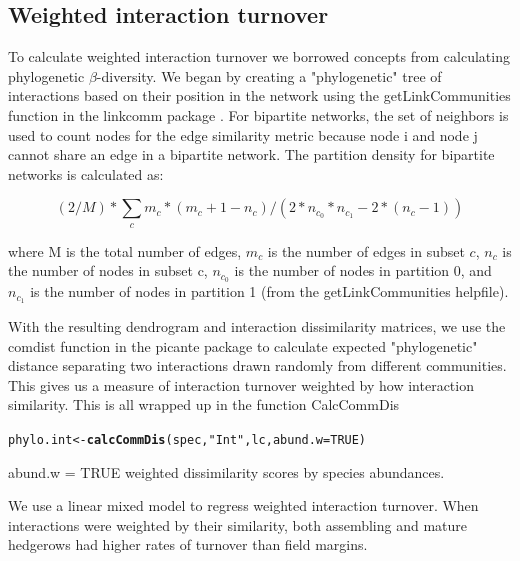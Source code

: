 \documentclass{article}\usepackage[]{graphicx}\usepackage[]{color}
\makeatletter
\newcommand{\hlnum}[1]{\textcolor[rgb]{0.686,0.059,0.569}{#1}}%
\newcommand{\hlstr}[1]{\textcolor[rgb]{0.192,0.494,0.8}{#1}}%
\newcommand{\hlstd}[1]{\textcolor[rgb]{0.345,0.345,0.345}{#1}}%
\newcommand{\hlkwb}[1]{\textcolor[rgb]{0.69,0.353,0.396}{#1}}%
\newcommand{\hlkwc}[1]{\textcolor[rgb]{0.333,0.667,0.333}{#1}}%
\newcommand{\hlkwd}[1]{\textcolor[rgb]{0.737,0.353,0.396}{\textbf{#1}}}%
\newenvironment{kframe}{%
 \def\at@end@of@kframe{}%
 \ifinner\ifhmode%
  \def\at@end@of@kframe{\end{minipage}}%
  \begin{minipage}{\columnwidth}%
 \fi\fi%
 \def\FrameCommand##1{\hskip\@totalleftmargin \hskip-\fboxsep
 \colorbox{shadecolor}{##1}\hskip-\fboxsep
     \hskip-\linewidth \hskip-\@totalleftmargin \hskip\columnwidth}%
 \MakeFramed {\advance\hsize-\width
   \@totalleftmargin\z@ \linewidth\hsize
   \@setminipage}}%
 {\par\unskip\endMakeFramed%
 \at@end@of@kframe}
\newenvironment{knitrout}{}{} %
\makeatother
\begin{document}
\subsection{Weighted interaction turnover}



To calculate weighted interaction turnover we borrowed concepts from
calculating phylogenetic $\beta$-diversity. We began by creating a
"phylogenetic" tree of interactions based on their position in the
network using the getLinkCommunities function in the linkcomm package
\citep{kalinka2011linkcomm}. For bipartite networks, the set of
neighbors is used to count nodes for the edge similarity metric
because node i and node j cannot share an edge in a bipartite
network. The partition density for bipartite networks is calculated
as:


\begin{equation}
 (2/M)*\sum_c m_c*(m_c + 1-n_c)/(2*n_{c_0}*n_{c_1} - 2*(n_c - 1))
\end{equation}

where M is the total number of edges, $m_c$ is the number of edges in
subset $c$, $n_c$ is the number of nodes in subset c, $n_{c_0}$ is the
number of nodes in partition 0, and $n_{c_1}$ is the number of nodes
in partition 1 (from the getLinkCommunities helpfile).

With the resulting dendrogram and interaction dissimilarity matrices,
we use the comdist function in the picante package
\citep{picante-2010-1463} to calculate expected "phylogenetic"
distance separating two interactions drawn randomly from different
communities. This gives us a measure of interaction turnover weighted
by how interaction similarity. This is all wrapped up in the function
CalcCommDis

\begin{knitrout}
\color{fgcolor}\begin{kframe}
\begin{alltt}
\hlstd{phylo.int} \hlkwb{<-} \hlkwd{calcCommDis}\hlstd{(spec,} \hlstr{"Int"}\hlstd{, lc,} \hlkwc{abund.w}\hlstd{=}\hlnum{TRUE}\hlstd{)}
\end{alltt}
\end{kframe}
\end{knitrout}

abund.w = TRUE weighted dissimilarity scores by species abundances.

We use a linear mixed model to regress weighted interaction turnover. When
interactions were weighted by their similarity, both assembling and
mature hedgerows had higher rates of turnover than field margins.
\end{document}
